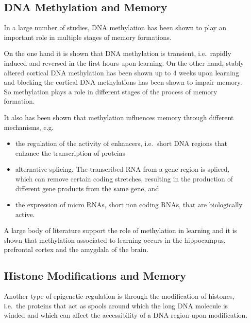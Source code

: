 \documentclass[
  11pt,
]{book}
\providecommand{\tightlist}{%
  \setlength{\itemsep}{0pt}\setlength{\parskip}{0pt}}
\begin{document}
\hypertarget{dna-methylation-and-memory}{%
\subsection{DNA Methylation and Memory}\label{dna-methylation-and-memory}}

In a large number of studies, DNA methylation has been shown to play an important role in multiple stages of memory formations.

On the one hand it is shown that DNA methylation is transient, i.e.~rapidly induced and reversed in the first hours upon learning. On the other hand, stably altered cortical DNA methylation has been shown up to 4 weeks upon learning and blocking the cortical DNA methylations has been shown to impair memory.
So methylation plays a role in different stages of the process of memory formation.

It also has been shown that methylation influences memory through different mechanisms, e.g.~

\begin{itemize}
\tightlist
\item
  the regulation of the activity of enhancers, i.e.~short DNA regions that enhance the transcription of proteins
\item
  alternative splicing. The transcribed RNA from a gene region is spliced, which can remove certain coding stretches, resulting in the production of different gene products from the same gene, and
\item
  the expression of micro RNAs, short non coding RNAs, that are biologically active.
\end{itemize}

A large body of literature support the role of methylation in learning and it is shown that methylation associated to learning occurs in the hippocampus, prefrontal cortex and the amygdala of the brain.

\hypertarget{histone-modifications-and-memory}{%
\subsection{Histone Modifications and Memory}\label{histone-modifications-and-memory}}

Another type of epigenetic regulation is through the modification of histones, i.e.~the proteins that act as spools around which the long DNA molecule is winded and which can affect the accessibility of a DNA region upon modification.
\end{document}
